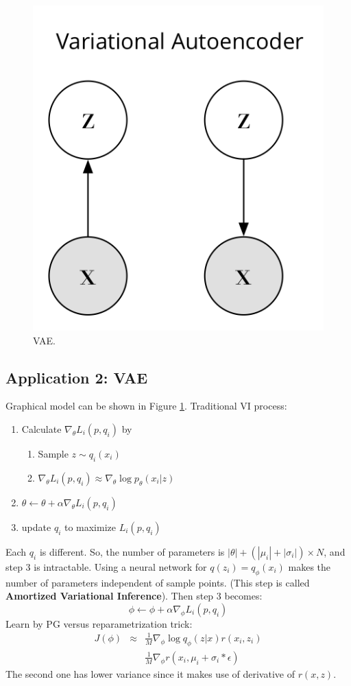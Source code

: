 \documentclass{article}
\begin{document}
\begin{figure}
	\begin{center}
		\includegraphics[width=.3\linewidth]{vae.png}
	\end{center}
	\caption{VAE.}
\label{fig-VAE}
\end{figure}

\subsection{Application 2: VAE}
Graphical model can be shown in Figure \ref{fig-VAE}. Traditional VI process:
\begin{enumerate}
\item Calculate $\nabla_\theta L_i(p,q_i)$ by
  \begin{enumerate}
    \item Sample $z\sim q_i(x_i)$
    \item $\nabla_{\theta}L_i(p,q_i)\approx \nabla_{\theta}\log p_{\theta}(x_i|z)$
  \end{enumerate}
\item $\theta \leftarrow \theta + \alpha\nabla_{\theta}L_i(p,q_i)$
\item update $q_i$ to maximize $L_i(p, q_i)$
\end{enumerate}
Each $q_i$ is different. So, the number of parameters is $|\theta|+(|\mu_i|+|\sigma_i|)\times N$, and step 3 is intractable. Using a neural network for $q(z_i)=q_{\phi}(x_i)$ makes the number of parameters independent of sample points. (This step is called \textbf{Amortized Variational Inference}). Then step 3 becomes:
\begin{equation*}
\phi \leftarrow \phi + \alpha\nabla_{\phi}L_i(p,q_i)
\end{equation*}
Learn by PG versus reparametrization trick:
\begin{eqnarray}
J(\phi) &\approx& \frac{1}{M}\nabla_{\phi}\log q_{\phi}(z|x)r(x_i, z_i)\\
&& \frac{1}{M} \nabla_{\phi}r(x_i, \mu_i+\sigma_i*\epsilon)
\end{eqnarray}
The second one has lower variance since it makes use of derivative of $r(x,z)$.
\end{document}
